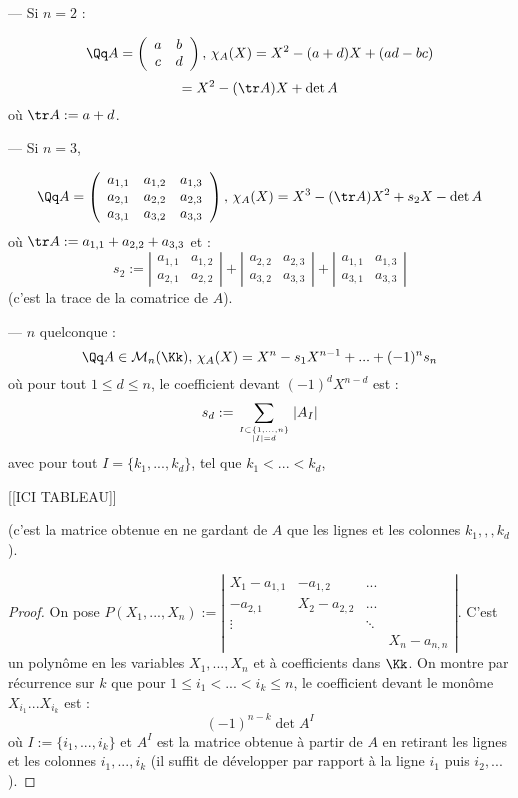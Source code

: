 \documentclass[class=report,crop=false]{standalone}
\begin{document}
\begin{exemple}[s]

--- Si $n=2$ :

\[\Qq A =\left(\begin{array}{cc}
a & b\\
c &d
\end{array}\right),\, \chi_A(X) = X^2 -(a+d)X + (ad-bc)\]
\[= X^2 -(\tr A) X + \det A\]
où $\tr A := a+d$.

--- Si $n=3$, 

\[\Qq A =\left(\begin{array}{ccc}
a_{1,1}& a_{1,2} & a_{1,3}\\
a_{2,1}& a_{2,2} & a_{2,3}\\
a_{3,1} & a_{3,2} & a_{3,3}
\end{array}\right),\, \chi_A(X) = X^3 - (\tr A) X^2 + s_2 X -\det A\]
où $\tr A := a_{1,1}+ a_{2,2} + a_{3,3}$ et :
\[s_2:= \left|\begin{array}{cc}
a_{1,1}&a_{1,2}\\
a_{2,1}&a_{2,2}
\end{array}\right| + \left|\begin{array}{cc}
a_{2,2}&a_{2,3}\\
a_{3,2}&a_{3,3}
\end{array}\right| +\left|\begin{array}{cc}
a_{1,1}&a_{1,3}\\
a_{3,1}&a_{3,3}
\end{array}\right|\]
(c'est la trace de la comatrice de $A$).

--- $n$ quelconque :
\[\Qq A \in \mathcal{M}_n(\Kk),\, \chi_A(X) = X^n -s_1 X^{n-1} + ... + (-1)^ns_n\]
où pour tout $1 \le d\le n$, le coefficient devant $(-1)^d X^{n-d}$ est :
\[s_d:= \sum_{I \subset \{1,...,n\}\atop |I| = d} |A_I|\]
avec pour tout $I =\{k_1,...,k_d\}$, tel que $k_1 < ... <k_d$, 

[[ICI TABLEAU]]


(c'est la matrice obtenue en ne gardant de $A$ que les lignes et les colonnes $k_1,,,k_d$).

\begin{proof}
On pose $P(X_1,...,X_n):=\left | \begin{array}{cccc}
X_1 -a_{1,1}& -a_{1,2}&...&\\
-a_{2,1} & X_2-a_{2,2}&...&\\
\vdots & &\ddots &\\
&&&X_n-a_{n,n}
\end{array}\right |$. C'est un polynôme en les variables $X_1,...,X_n$ et à coefficients dans $\Kk$. On montre par récurrence sur $k$ que pour $1\le i_1 <...<i_k\le n$, le coefficient devant le monôme $X_{i_1}...X_{i_k}$ est :
\[(-1)^{n-k}\det A^I\]
où $I := \{i_1,...,i_k\}$ et $A^I$ est la matrice obtenue à partir de $A$ en retirant les lignes et les colonnes $i_1,...,i_k$ (il suffit de développer par rapport à la ligne $i_1$ puis $i_2,...$).


\end{proof}
\end{exemple}
\end{document}
